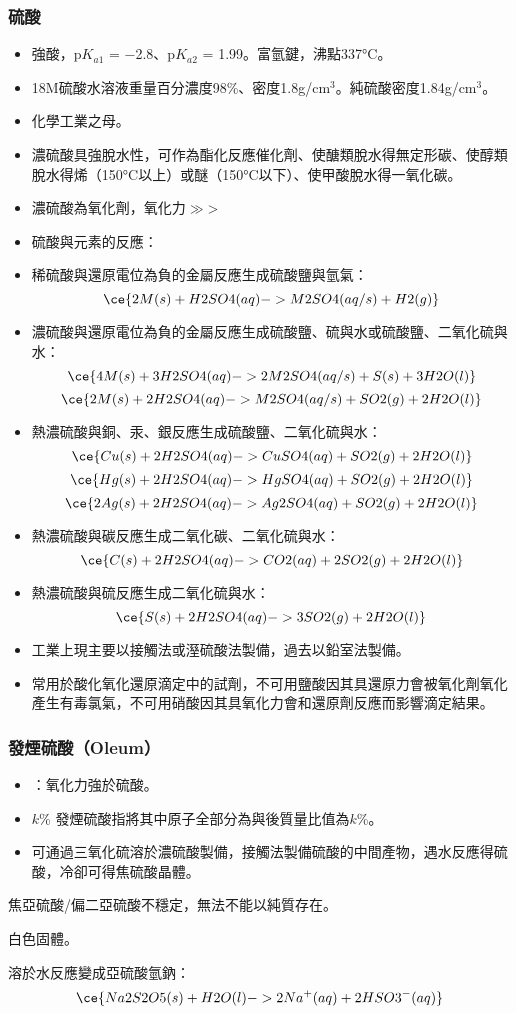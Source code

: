 \documentclass[a4paper,12pt]{report}
\begin{document}
\subsubsection{硫酸}
\begin{itemize}
\item 強酸，p$K_{a1}$ = −2.8、p$K_{a2}$ = 1.99。富氫鍵，沸點337°C。
\item 18M硫酸水溶液重量百分濃度98\%、密度1.8g/cm$^3$。純硫酸密度1.84g/cm$^3$。
\item 化學工業之母。
\item 濃硫酸具強脫水性，可作為酯化反應催化劑、使醣類脫水得無定形碳、使醇類脫水得烯（150°C以上）或醚（150°C以下）、使甲酸脫水得一氧化碳。
\item 濃硫酸為氧化劑，氧化力$\gg$>
\item 硫酸與元素的反應：
\bit
\item 稀硫酸與還原電位為負的金屬反應生成硫酸鹽與氫氣：
\[\ce{2M(s) + H2SO4(aq) -> M2SO4(aq/s) + H2(g)}\]
\item 濃硫酸與還原電位為負的金屬反應生成硫酸鹽、硫與水或硫酸鹽、二氧化硫與水：
\[\ce{4M(s) + 3H2SO4(aq) -> 2M2SO4(aq/s) + S(s) + 3H2O(l)}\]
\[\ce{2M(s) + 2H2SO4(aq) -> M2SO4(aq/s) + SO2(g) + 2H2O(l)}\]
\item 熱濃硫酸與銅、汞、銀反應生成硫酸鹽、二氧化硫與水：
\[\ce{Cu(s) + 2H2SO4(aq) -> CuSO4(aq) + SO2(g) + 2H2O(l)}\]
\[\ce{Hg(s) + 2H2SO4(aq) -> HgSO4(aq) + SO2(g) + 2H2O(l)}\]
\[\ce{2Ag(s) + 2H2SO4(aq) -> Ag2SO4(aq) + SO2(g) + 2H2O(l)}\]
\item 熱濃硫酸與碳反應生成二氧化碳、二氧化硫與水：
\[\ce{C(s) + 2H2SO4(aq) -> CO2(aq) + 2SO2(g) + 2H2O(l)}\]
\item 熱濃硫酸與硫反應生成二氧化硫與水：
\[\ce{S(s) + 2H2SO4(aq) -> 3SO2(g) + 2H2O(l)}\]
\eit
\item 工業上現主要以接觸法或溼硫酸法製備，過去以鉛室法製備。
\item 常用於酸化氧化還原滴定中的試劑，不可用鹽酸因其具還原力會被氧化劑氧化產生有毒氯氣，不可用硝酸因其具氧化力會和還原劑反應而影響滴定結果。
\end{itemize}
\subsubsection{發煙硫酸（Oleum）}
\begin{itemize}
\item {}：氧化力強於硫酸。
\item $k$\% 發煙硫酸指將其中原子全部分為與後質量比值為$k$\%。
\item 可通過三氧化硫溶於濃硫酸製備，接觸法製備硫酸的中間產物，遇水反應得硫酸，冷卻可得焦硫酸晶體。
\end{itemize}
\bit
\item 焦亞硫酸/偏二亞硫酸不穩定，無法不能以純質存在。
\item 白色固體。
\item 溶於水反應變成亞硫酸氫鈉：
\[\ce{Na2S2O5(s) + H2O(l) -> 2Na^+(aq) + 2HSO3^-(aq)}\]
\eit
\end{document}
